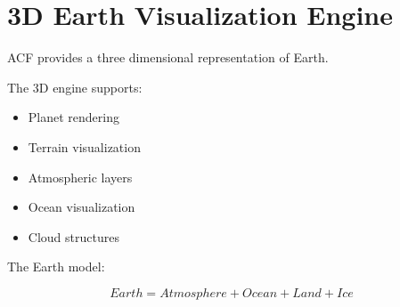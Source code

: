 \section{3D Earth Visualization Engine}


ACF provides a three dimensional representation of Earth.


The 3D engine supports:


\begin{itemize}

\item Planet rendering

\item Terrain visualization

\item Atmospheric layers

\item Ocean visualization

\item Cloud structures

\end{itemize}



The Earth model:


\[
Earth = Atmosphere + Ocean + Land + Ice
\]
